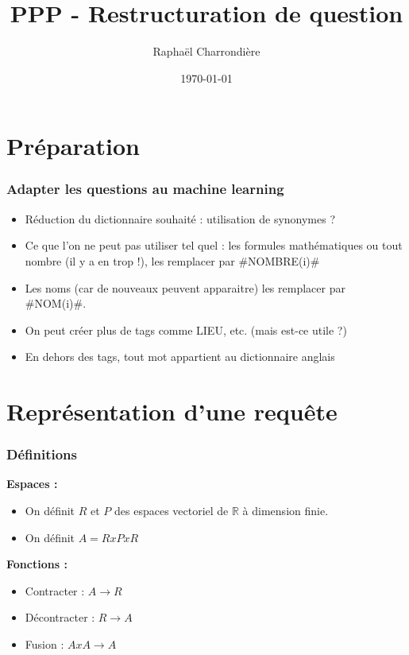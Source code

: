 \documentclass{beamer}
\title{ PPP - Restructuration de question}
\author{ Raphaël Charrondière  }
\date{ \today}
\begin{document}
\begin{frame}
\titlepage
\end{frame}

\begin{frame}
\tableofcontents%
\end{frame}

\section{Préparation}

\begin{frame}
\frametitle{Adapter les questions au machine learning}
\begin{itemize}
\item Réduction du dictionnaire souhaité : utilisation de synonymes ?

\item Ce que l'on ne peut pas utiliser tel quel : les formules mathématiques ou tout nombre (il y a en trop !), les remplacer par \#NOMBRE(i)\#

\item Les noms (car de nouveaux peuvent apparaitre)  les remplacer par \#NOM(i)\#. 
\item On peut créer plus de tags comme LIEU, etc. (mais est-ce utile ?)
\item En dehors des tags, tout mot appartient au dictionnaire anglais
\end{itemize}
\end{frame}

\section{Représentation d'une requête}

\begin{frame}
\frametitle{Définitions}
\textbf{Espaces :}
\begin{itemize}
\item On définit $R$ et $P$ des espaces vectoriel de $\mathbb{R}$ à dimension finie. 
\item On définit  $A=RxPxR$
\end{itemize}

\textbf{Fonctions :}
\begin{itemize}
\item Contracter : $A\rightarrow R$
\item Décontracter :  $R\rightarrow A$
\item Fusion : $AxA\rightarrow A$
\end{itemize}
\end{frame}
\end{document}

